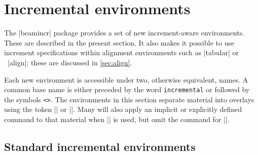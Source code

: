 \documentclass[a4paper]{ltxdoc}
\begin{document}
\section{Incremental environments}\label{sec:envs}

The |beamincr| package provides a set of new increment-aware environments.
These are described in the present section.  It also makes it possible to use
increment specifications within alignment environments such as |tabular| or
\AmSTeX\ |align|; these are discussed in \cref{sec:align}.

Each new environment is accessible under two, otherwise equivalent, names.  A
common base name is either preceded by the word \texttt{incremental} or followed
by the symbols \texttt{<>}.  The environments in this section separate material
into overlays using the token |\next| or |\next*|.  Many will also apply an
implicit or explicitly defined command to that material when |\next| is used,
but omit the command for |\next*|.

\subsection{Standard incremental environments}\label{sec:envs:incremental}
\end{document}
